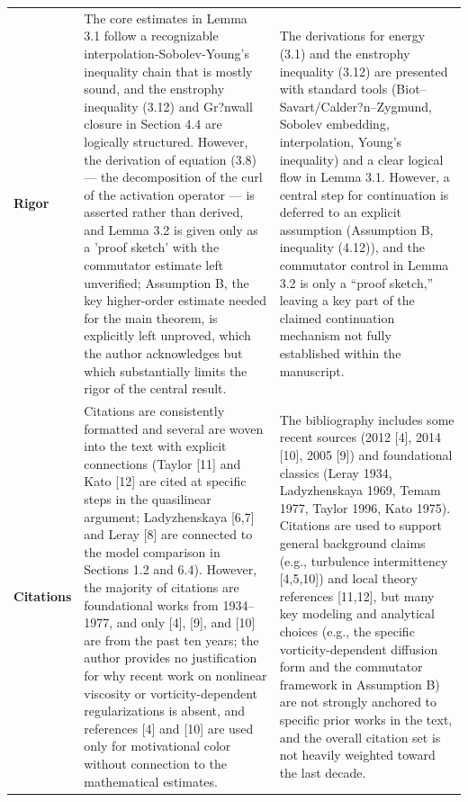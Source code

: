 \documentclass[11pt]{article}
\begin{document}
\begin{longtable}{@{} p{2.2cm} p{6.3cm} p{6.3cm} @{}}
\rowcolor{rowgray}
\textbf{Rigor} &
The core estimates in Lemma 3.1 follow a recognizable interpolation-Sobolev-Young's inequality chain that is mostly sound, and the enstrophy inequality (3.12) and Gr?nwall closure in Section 4.4 are logically structured. However, the derivation of equation (3.8) --- the decomposition of the curl of the activation operator --- is asserted rather than derived, and Lemma 3.2 is given only as a 'proof sketch' with the commutator estimate left unverified; Assumption B, the key higher-order estimate needed for the main theorem, is explicitly left unproved, which the author acknowledges but which substantially limits the rigor of the central result. &
The derivations for energy (3.1) and the enstrophy inequality (3.12) are presented with standard tools (Biot--Savart/Calder?n--Zygmund, Sobolev embedding, interpolation, Young's inequality) and a clear logical flow in Lemma 3.1. However, a central step for continuation is deferred to an explicit assumption (Assumption B, inequality (4.12)), and the commutator control in Lemma 3.2 is only a ``proof sketch,'' leaving a key part of the claimed continuation mechanism not fully established within the manuscript. \\[6pt]

\textbf{Citations} &
Citations are consistently formatted and several are woven into the text with explicit connections (Taylor [11] and Kato [12] are cited at specific steps in the quasilinear argument; Ladyzhenskaya [6,7] and Leray [8] are connected to the model comparison in Sections 1.2 and 6.4). However, the majority of citations are foundational works from 1934--1977, and only [4], [9], and [10] are from the past ten years; the author provides no justification for why recent work on nonlinear viscosity or vorticity-dependent regularizations is absent, and references [4] and [10] are used only for motivational color without connection to the mathematical estimates. &
The bibliography includes some recent sources (2012 [4], 2014 [10], 2005 [9]) and foundational classics (Leray 1934, Ladyzhenskaya 1969, Temam 1977, Taylor 1996, Kato 1975). Citations are used to support general background claims (e.g., turbulence intermittency [4,5,10]) and local theory references [11,12], but many key modeling and analytical choices (e.g., the specific vorticity-dependent diffusion form and the commutator framework in Assumption B) are not strongly anchored to specific prior works in the text, and the overall citation set is not heavily weighted toward the last decade. \\

\end{longtable}
\end{document}
